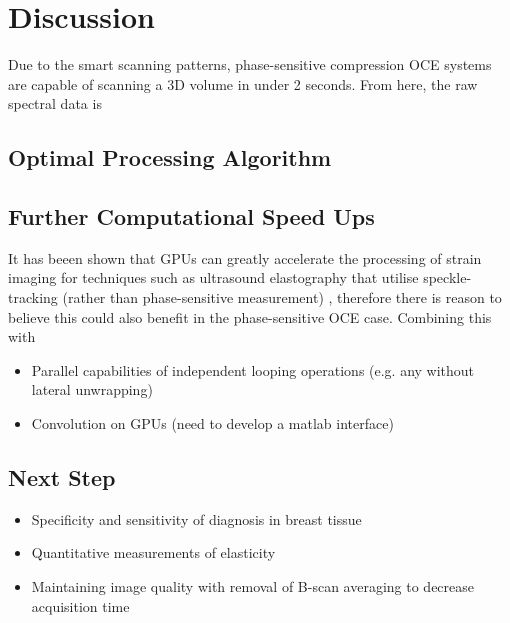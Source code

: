 \chapter{Discussion}

Due to the smart scanning patterns, phase-sensitive compression OCE systems are capable of scanning a 3D volume in under 2 seconds. From here, the raw spectral data is 

\section{Optimal Processing Algorithm}

\section{Further Computational Speed Ups}

It has beeen shown that GPUs can greatly accelerate the processing of strain imaging for techniques such as ultrasound elastography that utilise speckle-tracking (rather than phase-sensitive measurement) \cite{peng_gpu-accelerated_2017}, therefore there is reason to believe this could also benefit in the phase-sensitive OCE case. Combining this with 

\begin{itemize}
\item Parallel capabilities of independent looping operations (e.g. any without lateral unwrapping)
\item Convolution on GPUs (need to develop a matlab interface)
\end{itemize}

\section{Next Step}

\begin{itemize}
\item Specificity and sensitivity of diagnosis in breast tissue
\item Quantitative measurements of elasticity
\item Maintaining image quality with removal of B-scan averaging to decrease acquisition time
\end{itemize}
